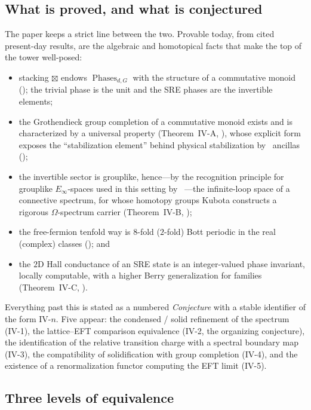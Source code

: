 \documentclass[12pt]{article}
\newcommand{\Phases}{\operatorname{Phases}}    %
\theoremstyle{definition}
\theoremstyle{remark}
\theoremstyle{plain}
\begin{document}
\subsection{What is proved, and what is conjectured}

The paper keeps a strict line between the two. Provable today, from cited
present-day results, are the algebraic and homotopical facts that make the top of
the tower well-posed:
\begin{itemize}
\item stacking $\boxtimes$ endows $\Phases_{d,G}$ with the structure of a
  commutative monoid (); the trivial phase is the unit and the
  SRE phases are the invertible elements;
\item the Grothendieck group completion of a commutative monoid exists and is
  characterized by a universal property (Theorem~IV-A, ), whose
  explicit form exposes the ``stabilization element'' behind physical
  stabilization by~%
  ancillas ();
\item the invertible sector is grouplike, hence---by the recognition principle
  for grouplike $E_\infty$-spaces used in this setting by~%
  \cite{beaudry-etal,kubota-omega-spectrum}---the infinite-loop space of a
  connective spectrum, for whose homotopy groups Kubota constructs a rigorous
  $\Omega$-spectrum carrier (Theorem~IV-B, );
\item the free-fermion tenfold way is $8$-fold ($2$-fold) Bott periodic in the
  real (complex) classes (); and
\item the $2$D Hall conductance of an SRE state is an integer-valued phase
  invariant, locally computable, with a higher Berry generalization for families
  (Theorem~IV-C, ).
\end{itemize}
Everything past this is stated as a numbered \emph{Conjecture} with a stable
identifier of the form IV-$n$. Five appear: the condensed / solid refinement of
the spectrum (IV-1), the lattice--EFT comparison equivalence (IV-2, the
organizing conjecture), the identification of the relative transition charge with
a spectral boundary map (IV-3), the compatibility of solidification with group
completion (IV-4), and the existence of a renormalization functor computing the
EFT limit (IV-5).

\subsection{Three levels of equivalence}
\label{subsec:levels}
\end{document}
